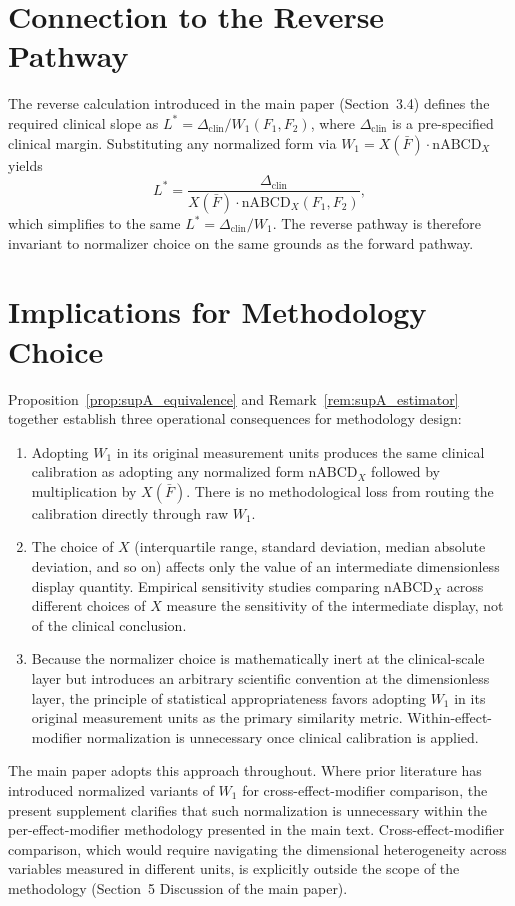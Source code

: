 \documentclass[11pt]{article}
\begin{document}
\section{Connection to the Reverse Pathway}\label{sec:supA_reverse}

The reverse calculation introduced in the main paper (Section~3.4) defines the required clinical slope as $L^* = \Delta_{\text{clin}} / W_1(F_1, F_2)$, where $\Delta_{\text{clin}}$ is a pre-specified clinical margin. Substituting any normalized form via $W_1 = X(\bar{F}) \cdot \text{nABCD}_X$ yields
\[
L^* = \frac{\Delta_{\text{clin}}}{X(\bar{F}) \cdot \text{nABCD}_X(F_1, F_2)},
\]
which simplifies to the same $L^* = \Delta_{\text{clin}} / W_1$. The reverse pathway is therefore invariant to normalizer choice on the same grounds as the forward pathway.

\section{Implications for Methodology Choice}\label{sec:supA_implications}

Proposition~\ref{prop:supA_equivalence} and Remark~\ref{rem:supA_estimator} together establish three operational consequences for methodology design:

\begin{enumerate}
\item Adopting $W_1$ in its original measurement units produces the same clinical calibration as adopting any normalized form $\text{nABCD}_X$ followed by multiplication by $X(\bar{F})$. There is no methodological loss from routing the calibration directly through raw $W_1$.
\item The choice of $X$ (interquartile range, standard deviation, median absolute deviation, and so on) affects only the value of an intermediate dimensionless display quantity. Empirical sensitivity studies comparing $\text{nABCD}_X$ across different choices of $X$ measure the sensitivity of the intermediate display, not of the clinical conclusion.
\item Because the normalizer choice is mathematically inert at the clinical-scale layer but introduces an arbitrary scientific convention at the dimensionless layer, the principle of statistical appropriateness favors adopting $W_1$ in its original measurement units as the primary similarity metric. Within-effect-modifier normalization is unnecessary once clinical calibration is applied.
\end{enumerate}

The main paper adopts this approach throughout. Where prior literature has introduced normalized variants of $W_1$ for cross-effect-modifier comparison, the present supplement clarifies that such normalization is unnecessary within the per-effect-modifier methodology presented in the main text. Cross-effect-modifier comparison, which would require navigating the dimensional heterogeneity across variables measured in different units, is explicitly outside the scope of the methodology (Section~5 Discussion of the main paper).
\end{document}
